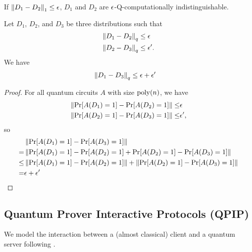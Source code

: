 \begin{rmk}\label{rmk:trace-to-comp}
If $\left\lVert D_1-D_2\right\rVert_1\leq \epsilon$, $D_1$ and $D_2$ are $\epsilon$-Q-computationally indistinguishable.
\end{rmk}

\begin{lem} \label{lem:computational-triangle0}
    Let $D_1$, $D_2$, and $D_3$ be three distributions such that 
    \begin{align}
        \left\lVert D_1 -D_2\right\rVert_q &\leq \epsilon \\ 
        \left\lVert D_2 -D_3\right\rVert_q &\leq \epsilon'. 
    \end{align}
    We have 
    \begin{align}
        \left\lVert D_1 -D_3\right\rVert_q &\leq \epsilon+\epsilon'
    \end{align}
\end{lem}
\begin{proof}
For all quantum circuits $A$ with size $\operatorname*{\operatorname{poly}}(n)$, we have 
\begin{align}
    \left\lVert\Pr[A({D_1})=1]-\Pr[A({D_2})=1]\right\rVert \leq& \epsilon \\
    \left\lVert\Pr[A({D_2})=1]-\Pr[A({D_3})=1]\right\rVert \leq& \epsilon',  
\end{align}
so 
\begin{align}
    &\left\lVert\Pr[A({D_1})=1]-\Pr[A({D_3})=1]\right\rVert \nonumber \\
    =& \left\lVert\Pr[A({D_1})=1]-\Pr[A({D_2})=1]+\Pr[A({D_2})=1]-\Pr[A({D_3})=1]\right\rVert \nonumber \\
    \leq&  \left\lVert\Pr[A({D_1})=1]-\Pr[A({D_2})=1]\right\rVert +\left\lVert\Pr[A({D_2})=1]-\Pr[A({D_3})=1]\right\rVert \nonumber \\
    =& \epsilon +\epsilon' \nonumber
\end{align}

\end{proof}



\subsection{Quantum Prover Interactive Protocols (QPIP)}


We model the interaction between a (almost classical) client and a quantum server following \cite{FOCS:Mahadev18a}.

